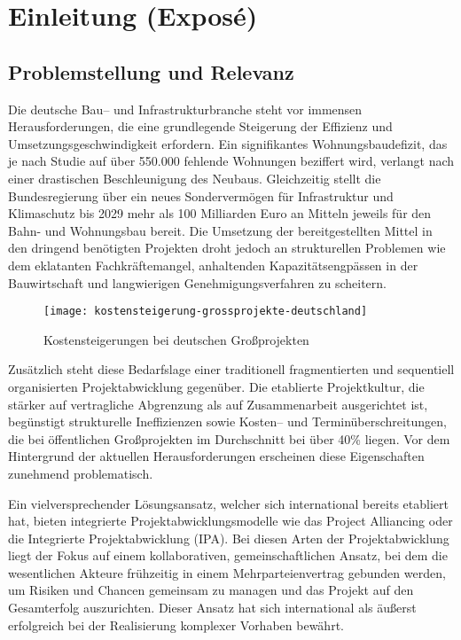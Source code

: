 \chapter{Einleitung (Exposé)}
\label{ch:einleitung}

\section*{Problemstellung und Relevanz}
\label{sec:problemstellung}
Die deutsche Bau-- und Infrastrukturbranche steht vor immensen Herausforderungen, die  eine grundlegende Steigerung der Effizienz und Umsetzungsgeschwindigkeit erfordern.  Ein signifikantes Wohnungsbaudefizit, das je nach Studie auf über 550.000 fehlende  Wohnungen beziffert wird, verlangt nach einer drastischen Beschleunigung des Neubaus\autocite[]{}. Gleichzeitig stellt die  Bundesregierung über ein neues Sondervermögen für Infrastruktur und Klimaschutz bis  2029 mehr als 100 Milliarden Euro an Mitteln jeweils für den Bahn- und Wohnungsbau  bereit\autocite[]{brinkmeier2025}. Die Umsetzung der bereitgestellten Mittel in den dringend  benötigten Projekten droht jedoch an strukturellen Problemen wie dem eklatanten  Fachkräftemangel, anhaltenden Kapazitätsengpässen in der Bauwirtschaft und  langwierigen Genehmigungsverfahren zu scheitern\autocite[]{hdb2025}.

\begin{figure}[htbp]
    \centering
    \texttt{[image: kostensteigerung-grossprojekte-deutschland]}
    \caption{Kostensteigerungen bei deutschen Großprojekten \cite{statista2024grossprojekte}}
    \label{fig:kostensteigerung-grossprojekte}
\end{figure}
\clearpage
Zusätzlich steht diese Bedarfslage einer traditionell fragmentierten und sequentiell  organisierten Projektabwicklung gegenüber. Die etablierte Projektkultur, die stärker auf  vertragliche Abgrenzung als auf Zusammenarbeit ausgerichtet ist, begünstigt strukturelle  Ineffizienzen sowie Kosten-- und Terminüberschreitungen, die bei öffentlichen  Großprojekten im Durchschnitt bei über 40\% liegen\autocite[]{korn2019}. Vor dem  Hintergrund der aktuellen Herausforderungen erscheinen diese Eigenschaften  zunehmend problematisch.

Ein vielversprechender Lösungsansatz, welcher sich international bereits etabliert hat,  bieten integrierte Projektabwicklungsmodelle wie das Project Alliancing oder die  Integrierte Projektabwicklung (IPA). Bei diesen Arten der Projektabwicklung liegt der  Fokus auf einem kollaborativen, gemeinschaftlichen Ansatz, bei dem die wesentlichen  Akteure frühzeitig in einem Mehrparteienvertrag gebunden werden, um Risiken und  Chancen gemeinsam zu managen und das Projekt auf den Gesamterfolg auszurichten.  Dieser Ansatz hat sich international als äußerst erfolgreich bei der Realisierung  komplexer Vorhaben bewährt\autocite[]{cook2014}.

